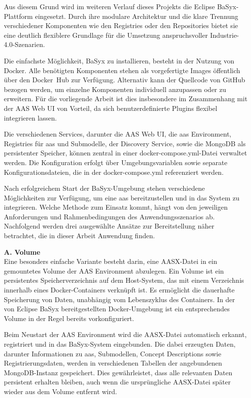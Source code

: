 Aus diesem Grund wird im weiteren Verlauf dieses Projekts die Eclipse BaSyx-Plattform eingesetzt.
Durch ihre modulare Architektur und die klare Trennung verschiedener Komponenten wie den Registries oder den 
Repositories bietet sie eine deutlich flexiblere Grundlage für die Umsetzung anspruchsvoller Industrie-4.0-Szenarien.

Die einfachste Möglichkeit, BaSyx zu installieren, besteht in der Nutzung von Docker.
Alle benötigten Komponenten stehen als vorgefertigte Images öffentlich über den \mbox{Docker Hub} \cite{BaSyxDockerHub} zur Verfügung. 
Alternativ kann der Quellcode von GitHub \cite{BaSyxGithub} bezogen werden, um einzelne Komponenten individuell anzupassen oder zu erweitern.
Für die vorliegende Arbeit ist dies insbesondere im Zusammenhang mit der AAS Web UI von Vorteil, da sich benutzerdefinierte Plugins flexibel integrieren lassen.

Die verschiedenen Services, darunter die AAS Web UI, die \acs{aas} Environment, Registries für \acs{aas} und Submodelle, der Discovery Service, sowie die MongoDB als persistenter Speicher, können zentral in einer docker-compose.yml-Datei verwaltet werden.
Die Konfiguration erfolgt über Umgebungsvariablen sowie separate Konfigurationsdateien, die in der docker-compose.yml referenziert werden.

Nach erfolgreichem Start der BaSyx-Umgebung stehen verschiedene Möglichkeiten zur Verfügung, um eine \acs{aas} bereitzustellen und in das System zu integrieren. 
Welche Methode zum Einsatz kommt, hängt von den jeweiligen Anforderungen und Rahmenbedingungen des Anwendungsszenarios ab.
Nachfolgend werden drei ausgewählte Ansätze zur Bereitstellung näher betrachtet, die in dieser Arbeit Anwendung finden.

\vspace{0.5em}
\noindent\textbf{A. Volume}\\[0.5em]
Eine besonders einfache Variante besteht darin, eine AASX-Datei in ein gemountetes \mbox{Volume} der AAS Environment abzulegen.
Ein Volume ist ein persistentes Speicherverzeichnis auf dem Host-System, das mit einem Verzeichnis innerhalb eines Docker-Containers verknüpft ist.
Es ermöglicht die dauerhafte Speicherung von Daten, unabhängig vom Lebenszyklus des Containers.
In der von Eclipse BaSyx bereitgestellten Docker-Umgebung ist ein entsprechendes Volume in der Regel bereits vorkonfiguriert.

Beim Neustart der AAS Environment wird die AASX-Datei automatisch erkannt, registriert und in das BaSyx-System eingebunden.
Die dabei erzeugten Daten, darunter Informationen zu \acs{aas}, Submodellen, Concept Descriptions sowie Registrierungsdaten, werden in verschiedenen Tabellen der angebundenen MongoDB-Instanz gespeichert.
Dies gewährleistet, dass alle relevanten Daten persistent erhalten bleiben, auch wenn die ursprüngliche AASX-Datei später wieder aus dem Volume entfernt wird.

